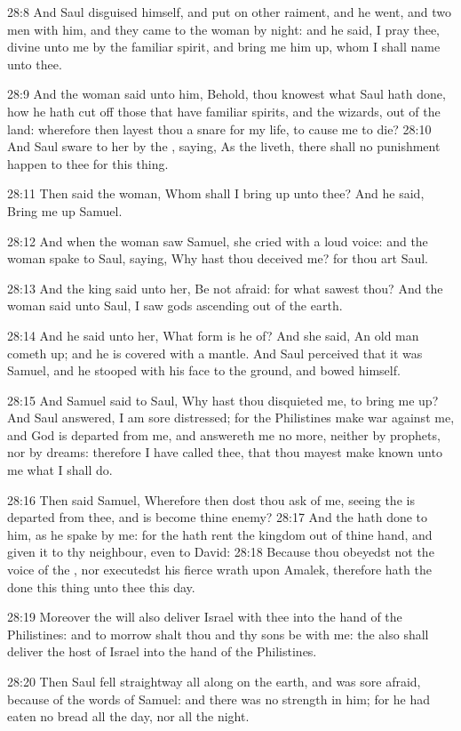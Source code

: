 28:8 And Saul disguised himself, and put on other raiment, and he
went, and two men with him, and they came to the woman by night: and
he said, I pray thee, divine unto me by the familiar spirit, and bring
me him up, whom I shall name unto thee.

28:9 And the woman said unto him, Behold, thou knowest what Saul hath
done, how he hath cut off those that have familiar spirits, and the
wizards, out of the land: wherefore then layest thou a snare for my
life, to cause me to die?  28:10 And Saul sware to her by the \LORD,
saying, As the \LORD liveth, there shall no punishment happen to thee
for this thing.

28:11 Then said the woman, Whom shall I bring up unto thee? And he
said, Bring me up Samuel.

28:12 And when the woman saw Samuel, she cried with a loud voice: and
the woman spake to Saul, saying, Why hast thou deceived me? for thou
art Saul.

28:13 And the king said unto her, Be not afraid: for what sawest thou?
And the woman said unto Saul, I saw gods ascending out of the earth.

28:14 And he said unto her, What form is he of? And she said, An old
man cometh up; and he is covered with a mantle. And Saul perceived
that it was Samuel, and he stooped with his face to the ground, and
bowed himself.

28:15 And Samuel said to Saul, Why hast thou disquieted me, to bring
me up? And Saul answered, I am sore distressed; for the Philistines
make war against me, and God is departed from me, and answereth me no
more, neither by prophets, nor by dreams: therefore I have called
thee, that thou mayest make known unto me what I shall do.

28:16 Then said Samuel, Wherefore then dost thou ask of me, seeing the
\LORD is departed from thee, and is become thine enemy?  28:17 And the
\LORD hath done to him, as he spake by me: for the \LORD hath rent the
kingdom out of thine hand, and given it to thy neighbour, even to
David: 28:18 Because thou obeyedst not the voice of the \LORD, nor
executedst his fierce wrath upon Amalek, therefore hath the \LORD done
this thing unto thee this day.

28:19 Moreover the \LORD will also deliver Israel with thee into the
hand of the Philistines: and to morrow shalt thou and thy sons be with
me: the \LORD also shall deliver the host of Israel into the hand of
the Philistines.

28:20 Then Saul fell straightway all along on the earth, and was sore
afraid, because of the words of Samuel: and there was no strength in
him; for he had eaten no bread all the day, nor all the night.

